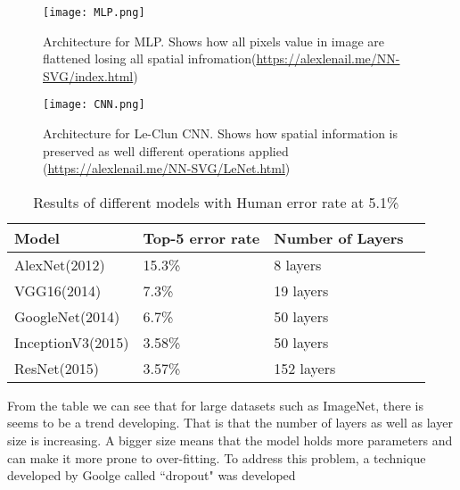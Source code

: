 \begin{figure}[H]
	\centering
	\texttt{[image: MLP.png]}
	\caption{Architecture for MLP. Shows how all pixels value in image are flattened losing all spatial infromation(\url{https://alexlenail.me/NN-SVG/index.html})}
	\label{fig:MLP}
\end{figure}


\begin{figure}[H]
	\centering
	\texttt{[image: CNN.png]}
	\caption{Architecture for Le-Clun CNN. Shows how spatial information is preserved as well different operations applied (\url{https://alexlenail.me/NN-SVG/LeNet.html})}
	\label{fig:CNN}
\end{figure}

\begin{table}[H]
	\centering
	\small
	\begin{tabular}{llll}
		\toprule 	Model & Top-5 error rate &Number of Layers\\
		\midrule
		AlexNet(2012)  & 15.3\%	&  8 layers\\
		VGG16(2014)&7.3\%  & 19 layers\\
		GoogleNet(2014)&6.7\% & 50 layers\\
		InceptionV3(2015)&3.58\%& 50 layers\\
		ResNet(2015)    &3.57\% &152 layers\\
		\bottomrule
	\end{tabular}


	\caption{Results of different models with Human error rate at 5.1\%}\label{tab:Results}
\end{table}




From the table we can see that for large datasets such as ImageNet, there is seems to be a trend developing. That is that the number of layers as well as layer size is increasing. A bigger size means that the model holds more parameters and can make it more prone to over-fitting. To address this problem, a technique developed by Goolge called ``dropout" was developed \cite{hinton2012improving}
